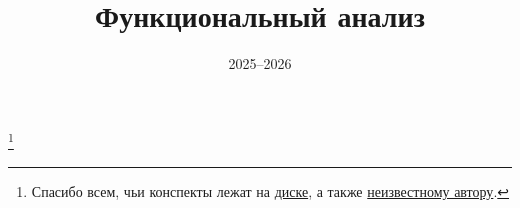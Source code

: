 \documentclass[a4paper]{article}
\title{Функциональный анализ}
\author{}
\date{2025--2026}
\begin{document}
	\maketitle
	\thanks{Спасибо всем, чьи конспекты лежат на
		\href{https://drive.google.com/drive/folders/18tGC6ZZIjT4OHMk9XwS46TRw2ruKYZ-U}{диске}, а
		также
	\href{https://file.notion.so/f/f/fd4b9427-9394-40bf-b34a-34d761a8a6d6/712e8222-11bf-4bdf-90f2-5c9d05a6b14a/funcan.pdf?table=block\&id=228d0188-b218-80ac-8116-eda614bcb416\&spaceId=fd4b9427-9394-40bf-b34a-34d761a8a6d6\&expirationTimestamp=1768089600000\&signature=rqpk1CBj0-3wYy2c-flOSIq-_K09YNkEHZIgS8cmuXQ\&downloadName=конспектик.pdf}{неизвестному автору}.}
	\tableofcontents

    
	
	
	
\end{document}

